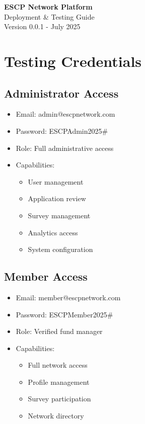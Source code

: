 \documentclass[11pt,a4paper]{article}
\begin{document}
\begin{center}
\LARGE\textbf{ESCP Network Platform}\\[0.5cm]
\large Deployment \& Testing Guide\\[0.5cm]
\normalsize Version 0.0.1 - July 2025
\end{center}

\section{Testing Credentials}

\subsection{Administrator Access}
\begin{tcolorbox}[colback=white,colframe=primaryBlue!20,title=Admin Credentials]
\begin{itemize}[leftmargin=*]
    \item Email: admin@escpnetwork.com
    \item Password: ESCPAdmin2025\#
    \item Role: Full administrative access
    \item Capabilities:
    \begin{itemize}
        \item User management
        \item Application review
        \item Survey management
        \item Analytics access
        \item System configuration
    \end{itemize}
\end{itemize}
\end{tcolorbox}

\subsection{Member Access}
\begin{tcolorbox}[colback=white,colframe=primaryBlue!20,title=Member Credentials]
\begin{itemize}[leftmargin=*]
    \item Email: member@escpnetwork.com
    \item Password: ESCPMember2025\#
    \item Role: Verified fund manager
    \item Capabilities:
    \begin{itemize}
        \item Full network access
        \item Profile management
        \item Survey participation
        \item Network directory
    \end{itemize}
\end{itemize}
\end{tcolorbox}
\end{document}
